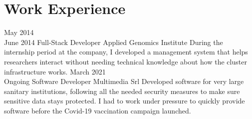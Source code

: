 \section*{Work Experience}
\begin{entrylist}
  \entry
    {May 2014\\ June 2014}
    {Full-Stack Developer}
    {Applied Genomics Institute}
    {During the internship period at the company, I developed a management system that helps researchers interact without needing technical knowledge about how the cluster infrastructure works.}
  \entry
    {March 2021\\ Ongoing}
    {Software Developer}
    {Multimedia Srl}
    {Developed software for very large sanitary institutions, following all the needed security measures to make sure sensitive data stays protected.
    I had to work under pressure to quickly provide software before the Covid-19 vaccination campaign launched.}
\end{entrylist}
